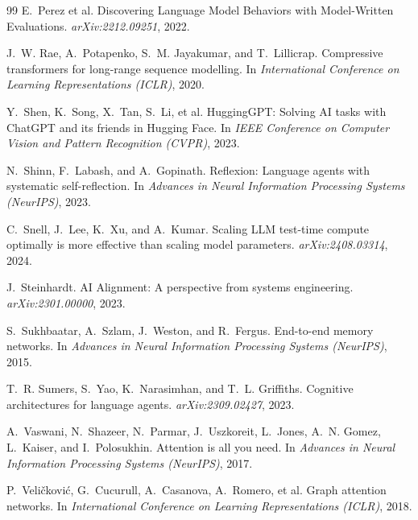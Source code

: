 \documentclass[conference]{IEEEtran}
\begin{document}
\begin{thebibliography}{99}
E.~Perez et al.
\newblock Discovering Language Model Behaviors with Model-Written Evaluations.
\newblock \emph{arXiv:2212.09251}, 2022.

J.~W. Rae, A.~Potapenko, S.~M. Jayakumar, and T.~Lillicrap.
\newblock Compressive transformers for long-range sequence modelling.
\newblock In \emph{International Conference on Learning Representations (ICLR)}, 2020.

Y.~Shen, K.~Song, X.~Tan, S.~Li, et al.
\newblock HuggingGPT: Solving AI tasks with ChatGPT and its friends in Hugging Face.
\newblock In \emph{IEEE Conference on Computer Vision and Pattern Recognition (CVPR)}, 2023.

N.~Shinn, F.~Labash, and A.~Gopinath.
\newblock Reflexion: Language agents with systematic self-reflection.
\newblock In \emph{Advances in Neural Information Processing Systems (NeurIPS)}, 2023.

C.~Snell, J.~Lee, K.~Xu, and A.~Kumar.
\newblock Scaling {LLM} test-time compute optimally is more effective than scaling model parameters.
\newblock \emph{arXiv:2408.03314}, 2024.

J.~Steinhardt.
\newblock AI Alignment: A perspective from systems engineering.
\newblock \emph{arXiv:2301.00000}, 2023.

S.~Sukhbaatar, A.~Szlam, J.~Weston, and R.~Fergus.
\newblock End-to-end memory networks.
\newblock In \emph{Advances in Neural Information Processing Systems (NeurIPS)}, 2015.

T.~R. Sumers, S.~Yao, K.~Narasimhan, and T.~L. Griffiths.
\newblock Cognitive architectures for language agents.
\newblock \emph{arXiv:2309.02427}, 2023.

A.~Vaswani, N.~Shazeer, N.~Parmar, J.~Uszkoreit, L.~Jones, A.~N. Gomez, L.~Kaiser, and I.~Polosukhin.
\newblock Attention is all you need.
\newblock In \emph{Advances in Neural Information Processing Systems (NeurIPS)}, 2017.

P.~Veli{\v{c}}kovi{\'{c}}, G.~Cucurull, A.~Casanova, A.~Romero, et al.
\newblock Graph attention networks.
\newblock In \emph{International Conference on Learning Representations (ICLR)}, 2018.


\end{thebibliography}
\end{document}
